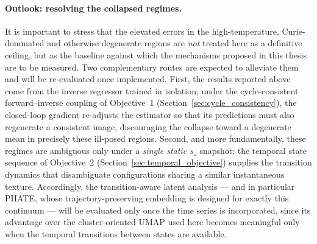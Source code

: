 \documentclass[letterpaper, 12, one column]{article}
\begin{document}
{\color[rgb]{0,0,1}\paragraph{Outlook: resolving the collapsed regimes.}
It is important to stress that the elevated errors in the
high-temperature, Curie-dominated and otherwise degenerate regions are
\emph{not} treated here as a definitive ceiling, but as the baseline
against which the mechanisms proposed in this thesis are to be measured.
Two complementary routes are expected to alleviate them and will be
re-evaluated once implemented. First, the results reported above come
from the inverse regressor trained in isolation; under the
cycle-consistent forward--inverse coupling of Objective~1
(Section~\ref{sec:cycle_consistency}), the closed-loop gradient
re-adjusts the estimator so that its predictions must also regenerate a
consistent image, discouraging the collapse toward a degenerate mean in
precisely these ill-posed regions. Second, and more fundamentally, these
regimes are ambiguous only under a \emph{single static} $s_z$ snapshot;
the temporal state sequence of Objective~2
(Section~\ref{sec:temporal_objective}) supplies the transition dynamics
that disambiguate configurations sharing a similar instantaneous
texture. Accordingly, the transition-aware latent analysis --- and in
particular PHATE, whose trajectory-preserving embedding is designed for
exactly this continuum --- will be evaluated only once the time series is
incorporated, since its advantage over the cluster-oriented UMAP used
here becomes meaningful only when the temporal transitions between states
are available.}
\end{document}
